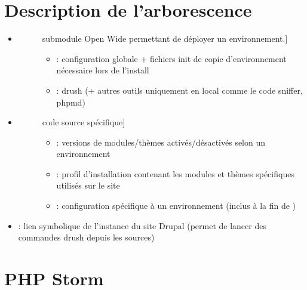 \documentclass[a4paper,11pt,french]{rtdsphinxmanual}
\begin{document}
\section{Description de l'arborescence}
\label{poste_travail:description-de-l-arborescence}\begin{itemize}
\item {} \begin{description}
\item[{}] \leavevmode{[}submodule Open Wide permettant de déployer un environnement.{]}\begin{itemize}
\item {} 
 : configuration globale + fichiers init de copie d'environnement nécessaire lors de l'install

\item {} 
 : drush (+ autres outils uniquement en local comme le code sniffer, phpmd)

\end{itemize}

\end{description}

\item {} \begin{description}
\item[{}] \leavevmode{[}code source spécifique{]}\begin{itemize}
\item {} 
 : versions de modules/thèmes activés/désactivés selon un environnement

\item {} 
 : profil d'installation contenant les modules et thèmes spécifiques utilisés sur le site

\item {} 
 : configuration spécifique à un environnement (inclus à la fin de )

\end{itemize}

\end{description}

\item {} 
 : lien symbolique de l'instance du site Drupal (permet de lancer des commandes drush depuis les sources)

\end{itemize}


\section{PHP Storm}
\label{poste_travail:php-storm}
\end{document}

